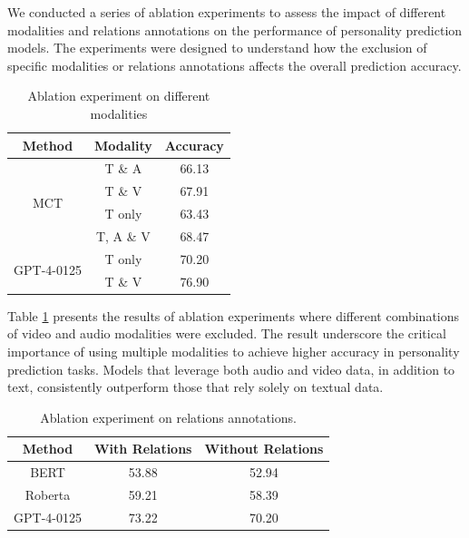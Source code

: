 We conducted a series of ablation experiments to assess the impact of different modalities and relations annotations on the performance of personality prediction models. The experiments were designed to understand how the exclusion of specific modalities or relations annotations affects the overall prediction accuracy.

\begin{table}[ht]
    \small
    \centering
    \begin{tabular}{c|c|c}
        \hline
        \textbf{Method} & \textbf{Modality} & \textbf{Accuracy}\\
        \hline
        \multirow{4}{*}{MCT} & T \& A & 66.13  \\
        & T \& V & 67.91 \\
        & T only & 63.43 \\
        & T, A \& V & 68.47 \\  
        \hline
        \multirow{2}{*}{GPT-4-0125} & T only & 70.20 \\     
        & T \& V & 76.90 \\
        \hline
    \end{tabular}
    \caption{Ablation experiment on different modalities} 
\label{table:Ablation_modal}
\end{table}


Table \ref{table:Ablation_modal} presents the results of ablation experiments where different combinations of video and audio modalities were excluded. The result underscore the critical importance of using multiple modalities to achieve higher accuracy in personality prediction tasks. Models that leverage both audio and video data, in addition to text, consistently outperform those that rely solely on textual data. 
\begin{table}[ht]
    \centering
    \small
    \begin{tabular}{ccc}
        \hline
        \textbf{Method} & \textbf{With Relations} & \textbf{Without Relations} \\
        \hline
        BERT & 53.88 & 52.94 \\
        \hline
        Roberta & 59.21 & 58.39 \\
        \hline
        GPT-4-0125 & 73.22 & 70.20 \\  
        \hline
    \end{tabular}
    \caption{Ablation experiment on relations annotations.}
    \label{table:Ablation_relationship}
\end{table}

